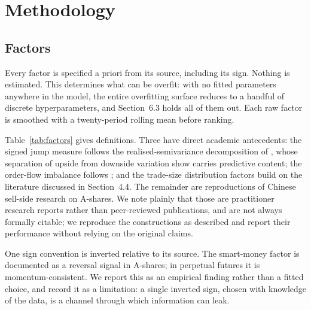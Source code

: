 \documentclass[11pt,letterpaper]{article}
\begin{document}
\section{Methodology}

\subsection{Factors}
\label{sec:factors}

Every factor is specified a priori from its source, including its sign. Nothing
is estimated. This determines what can be overfit: with no fitted parameters
anywhere in the model, the entire overfitting surface reduces to a handful of
discrete hyperparameters, and Section~6.3 holds all of them out. Each raw factor
is smoothed with a twenty-period rolling mean before ranking.

Table~\ref{tab:factors} gives definitions. Three have direct academic
antecedents: the signed jump measure follows the realised-semivariance
decomposition of \citet{bns2010}, whose separation of upside from downside
variation \citet{pattonsheppard2015} show carries predictive content; the
order-flow imbalance follows \citet{crs2002}; and the trade-size distribution
factors build on the literature discussed in Section~4.4. The remainder are
reproductions of Chinese sell-side research on A-shares. We note plainly that
those are practitioner research reports rather than peer-reviewed publications,
and are not always formally citable; we reproduce the constructions as described
and report their performance without relying on the original claims.

One sign convention is inverted relative to its source. The smart-money factor is
documented as a reversal signal in A-shares; in perpetual futures it is
momentum-consistent. We report this as an empirical finding rather than a fitted
choice, and record it as a limitation: a single inverted sign, chosen with
knowledge of the data, is a channel through which information can leak.
\end{document}

